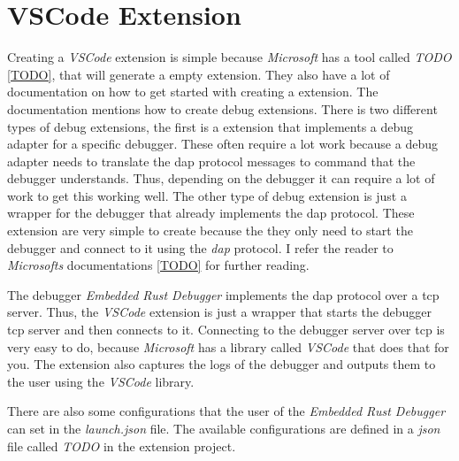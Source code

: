 \section{VSCode Extension}
Creating a \emph{VSCode} extension is simple because \emph{Microsoft} has a tool called \emph{TODO} \ref{TODO}, that will generate a empty extension.
They also have a lot of documentation on how to get started with creating a extension.
The documentation mentions how to create debug extensions.
There is two different types of debug extensions, the first is a extension that implements a debug adapter for a specific debugger.
These often require a lot work because a debug adapter needs to translate the \gls{dap} protocol messages to command that the debugger understands.
Thus, depending on the debugger it can require a lot of work to get this working well.
The other type of debug extension is just a wrapper for the debugger that already implements the \gls{dap} protocol.
These extension are very simple to create because the they only need to start the debugger and connect to it using the \emph{dap} protocol.
I refer the reader to \emph{Microsofts} documentations \ref{TODO} for further reading.

The debugger \emph{Embedded Rust Debugger} implements the \gls{dap} protocol over a \gls{tcp} server.
Thus, the \emph{VSCode} extension is just a wrapper that starts the debugger \gls{tcp} server and then connects to it.
Connecting to the debugger server over \gls{tcp} is very easy to do, because \emph{Microsoft} has a library called \emph{VSCode} that does that for you.
The extension also captures the logs of the debugger and outputs them to the user using the \emph{VSCode} library.

There are also some configurations that the user of the \emph{Embedded Rust Debugger} can set in the \emph{launch.json} file.
The available configurations are defined in a \emph{json} file called \emph{TODO} in the extension project.
